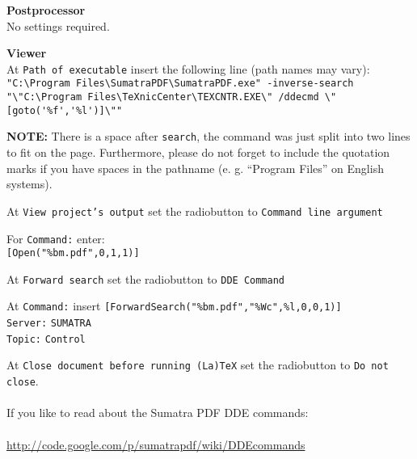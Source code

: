 \documentclass[parskip=half-]{scrartcl}
\begin{document}
\textbf{Postprocessor}\\
No settings required.

\textbf{Viewer}\\
At \texttt{Path of executable} insert the following line (path names may vary):\\
\verb+"C:\Program Files\SumatraPDF\SumatraPDF.exe" -inverse-search+\\ \verb+"\"C:\Program Files\TeXnicCenter\TEXCNTR.EXE\" /ddecmd \"[goto('%f','%l')]\""+

\textbf{NOTE:} There is a space after \texttt{search}, the command was just split into two lines to fit on the page. Furthermore, please do not forget to include the quotation marks if you have spaces in the pathname (e. g. ``Program Files'' on English systems).

At \texttt{View project's output} set the radiobutton to \texttt{Command line argument}

For \texttt{Command:} enter:\\
\verb+[Open("%bm.pdf",0,1,1)]+

At \texttt{Forward search} set the radiobutton to \texttt{DDE Command} 

At \texttt{Command:} insert\newline
\verb+[ForwardSearch("%bm.pdf","%Wc",%l,0,0,1)]+\\
\texttt{Server:} \texttt{SUMATRA}\\
\texttt{Topic:} \texttt{Control}

At \texttt{Close document before running (La)TeX} set the radiobutton to \texttt{Do not close}.\\
\\
If you like to read about the Sumatra PDF DDE commands:\\
\\
\url{http://code.google.com/p/sumatrapdf/wiki/DDEcommands}
\end{document}
